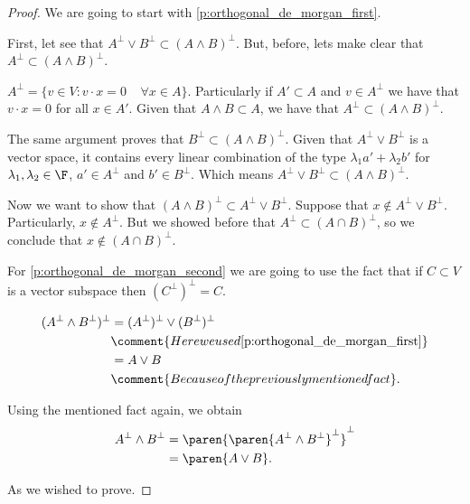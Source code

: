\begin{proof}
    We are going to start with \eqref{p:orthogonal_de_morgan_first}.\pn
    
    First, let see that $A^\perp \vee B^\perp \subset (A \wedge B)^\perp$. But, before, lets make clear that
    $A^\perp \subset (A \wedge B)^\perp$.\pn
    
    $A^\perp = \{ v \in V : v \cdot x = 0 \;\;\;\; \forall x \in A \}$. Particularly if $A' \subset A$ and $v \in A^\perp$
    we have that $v \cdot x = 0$ for all $x \in A'$. Given that $A \wedge B \subset A$, we have that $A^\perp \subset (A \wedge B)^\perp$.\pn
    
    The same argument proves that $B^\perp \subset (A \wedge B)^\perp$. Given that $A^\perp \vee B^\perp$ is a vector space,
    it contains every linear combination of the type $\lambda_1 a' + \lambda_2 b'$ for $\lambda_1, \lambda_2 \in \F$, $a' \in A^\perp$ and
    $b' \in B^\perp$. Which means $A^\perp \vee B^\perp \subset (A \wedge B)^\perp$.\pn
    
    Now we want to show that $(A \wedge B)^\perp \subset A^\perp \vee B^\perp$. Suppose that $x \notin A^\perp \vee B^\perp$. Particularly, 
    $x \notin A^\perp$. But we showed before that $A^\perp \subset (A \cap B)^\perp$, so we conclude that $x \notin (A \cap B)^\perp$.\pn
    
    For \eqref{p:orthogonal_de_morgan_second} we are going to use the fact that if $C \subset V$ is a vector subspace then
    $(C^\perp)^\perp = C$.
    
    \begin{align}
        (A^\perp \wedge B^\perp)^\perp  &=  (A^\perp)^\perp \vee (B^\perp)^\perp                            \\
                                        &\comment{Here we used \eqref{p:orthogonal_de_morgan_first}}        \\
                                        &=  A \vee B                                                        \\
                                        &\comment{Because of the previously mentioned fact}.
    \end{align}\pn
    
    Using the mentioned fact again, we obtain
    \begin{align}
        A^\perp \wedge B^\perp      &=  \paren{\paren{A^\perp \wedge B^\perp}^\perp}^\perp    \\
                                    &=  \paren{A \vee B}.
    \end{align}\pn
    
    As we wished to prove.
\end{proof}